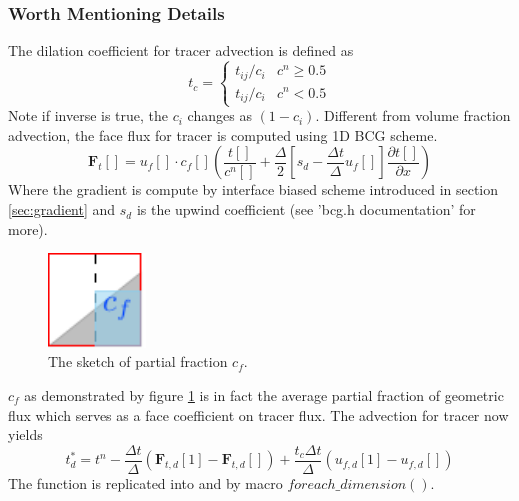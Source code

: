 \subsubsection{Worth Mentioning Details}
The dilation coefficient for tracer advection is defined as 
\begin{equation}\label{equ:tcoef}
    t_c=\left\{
    \begin{array}{cc}
        t_{ij}/c_i & c^n\geq0.5 \\
        t_{ij}/c_i & c^n<0.5
    \end{array}
    \right.
\end{equation}
Note if inverse is true, the $c_i$ changes as $(1-c_i)$. Different from volume fraction advection, the face flux for tracer is computed using 1D BCG scheme.
\begin{equation}\label{equ:bcgflux}
    \mathbf{F}_t[] = u_f[]\cdot c_f[](\frac{t[]}{c^n[]}+\frac{\Delta}{2}[s_d-\frac{\Delta t}{\Delta}u_f[]]\frac{\partial t[]}{\partial x})
\end{equation}
Where the gradient is compute by interface biased scheme introduced in section \ref{sec:gradient} and $s_d$ is the upwind coefficient (see 'bcg.h documentation' for more).
\begin{figure}[!htbp]
    \centering
    \includegraphics[height=2.5cm]{./image/vof-h/cf}
    \caption{The sketch of partial fraction $c_f$.}
    \label{fig:cfcompute}
\end{figure}
$c_f$ as demonstrated by figure \ref{fig:cfcompute} is in fact the average partial fraction of geometric flux which serves as a face coefficient on tracer flux. The advection for tracer now yields
\begin{equation}\label{equ:traceradv}
    t^\ast_d = t^n - \frac{\Delta t}{\Delta}(\mathbf{F}_{t,d}[1]-\mathbf{F}_{t,d}[]) + \frac{t_c\Delta t}{\Delta}(u_{f,d}[1]-u_{f,d}[])
\end{equation}
The function is replicated into  and  by macro $foreach\_dimension()$.

